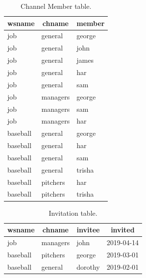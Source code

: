 \documentclass{article}
\begin{document}
\begin{table}[!p]
\centering
\begin{tabular}{l l l}
\toprule
\multicolumn{1}{c}{wsname} &
\multicolumn{1}{c}{chname} &
\multicolumn{1}{c}{member} \\
\midrule
job & general & george \\
job & general & john   \\
job & general & james  \\
job & general & har    \\
job & general & sam    \\
\midrule
job & managers & george \\
job & managers & sam   \\
job & managers & har   \\
\midrule
baseball & general & george  \\
baseball & general & har     \\
baseball & general & sam     \\
baseball & general & trisha  \\
\midrule
baseball & pitchers & har \\
baseball & pitchers & trisha \\
\bottomrule
\end{tabular}
\caption{Channel Member table.}
\label{tbl:chmember}
\end{table}

\begin{table}[!p]
\centering
\begin{tabular}{l l l l}
\toprule
\multicolumn{1}{c}{wsname} &
\multicolumn{1}{c}{chname} &
\multicolumn{1}{c}{invitee} &
\multicolumn{1}{c}{invited} \\
\midrule
job & managers & john & 2019-04-14 \\
baseball & pitchers & george & 2019-03-01 \\
baseball & general & dorothy & 2019-02-01 \\
\bottomrule
\end{tabular}
\caption{Invitation table.}
\label{tbl:invitation}
\end{table}
\end{document}
